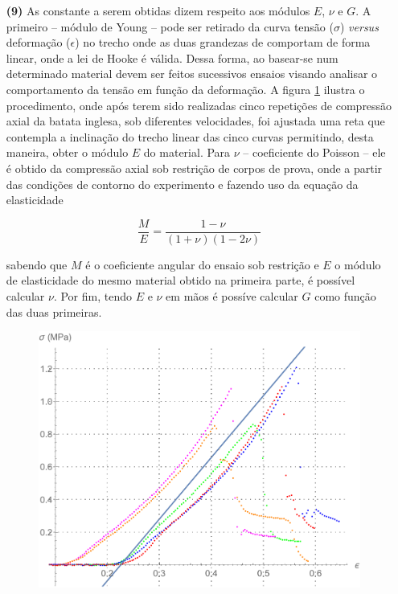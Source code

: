 \documentclass[a4paper, 12pt, brazilian]{article}
\begin{document}
\begin{itemize}
		\item[\textbf{(9)}] As constante a serem obtidas dizem respeito aos módulos $E$, $\nu$ e $G$. A primeiro -- módulo de Young -- pode ser retirado da curva tensão ($\sigma$) \textit{versus} deformação ($\epsilon$) no trecho onde as duas grandezas de comportam de forma linear, onde a lei de Hooke é válida. Dessa forma, ao basear-se num determinado material devem ser feitos sucessivos ensaios visando analisar o comportamento da tensão em função da deformação. A figura \cref{fig:graph} ilustra o procedimento, onde após terem sido realizadas cinco repetições de compressão axial da batata inglesa, sob diferentes velocidades, foi ajustada uma reta que contempla a inclinação do trecho linear das cinco curvas permitindo, desta maneira, obter o módulo $E$ do material. Para $\nu$ -- coeficiente do Poisson -- ele é obtido da compressão axial sob restrição de corpos de prova, onde a partir das condições de contorno do experimento e fazendo uso da equação da elasticidade 
		
		\begin{equation}
			\dfrac{M}{E}=\dfrac{1-\nu}{(1+\nu)(1-2\nu)}
		\end{equation}
		
		sabendo que $M$ é o coeficiente angular do ensaio sob restrição e $E$ o módulo de elasticidade do mesmo material obtido na primeira parte, é possível calcular $\nu$. Por fim, tendo $E$ e $\nu$ em mãos é possíve calcular $G$ como função das duas primeiras.
		
		\begin{figure}[H]
			\centering
			\includegraphics[scale=.6]{images/g3}
			\label{fig:graph}
		\end{figure} 	
	

\end{itemize}
\end{document}
